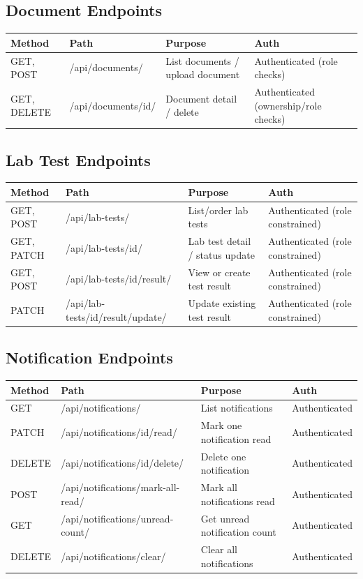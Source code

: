 \documentclass[12pt,a4paper]{article}
\begin{document}
\subsection{Document Endpoints}

\begin{longtable}{p{2cm} p{4.4cm} p{4.8cm} p{2.4cm}}
\toprule
\textbf{Method} & \textbf{Path} & \textbf{Purpose} & \textbf{Auth} \\
\midrule
GET, POST & /api/documents/ & List documents / upload document & Authenticated (role checks) \\
GET, DELETE & /api/documents/{id}/ & Document detail / delete & Authenticated (ownership/role checks) \\
\bottomrule
\end{longtable}

\subsection{Lab Test Endpoints}

\begin{longtable}{p{2cm} p{4.4cm} p{4.8cm} p{2.4cm}}
\toprule
\textbf{Method} & \textbf{Path} & \textbf{Purpose} & \textbf{Auth} \\
\midrule
GET, POST & /api/lab-tests/ & List/order lab tests & Authenticated (role constrained) \\
GET, PATCH & /api/lab-tests/{id}/ & Lab test detail / status update & Authenticated (role constrained) \\
GET, POST & /api/lab-tests/{id}/result/ & View or create test result & Authenticated (role constrained) \\
PATCH & /api/lab-tests/{id}/result/update/ & Update existing test result & Authenticated (role constrained) \\
\bottomrule
\end{longtable}

\subsection{Notification Endpoints}

\begin{longtable}{p{2cm} p{4.4cm} p{4.8cm} p{2.4cm}}
\toprule
\textbf{Method} & \textbf{Path} & \textbf{Purpose} & \textbf{Auth} \\
\midrule
GET & /api/notifications/ & List notifications & Authenticated \\
PATCH & /api/notifications/{id}/read/ & Mark one notification read & Authenticated \\
DELETE & /api/notifications/{id}/delete/ & Delete one notification & Authenticated \\
POST & /api/notifications/mark-all-read/ & Mark all notifications read & Authenticated \\
GET & /api/notifications/unread-count/ & Get unread notification count & Authenticated \\
DELETE & /api/notifications/clear/ & Clear all notifications & Authenticated \\
\bottomrule
\end{longtable}
\end{document}

